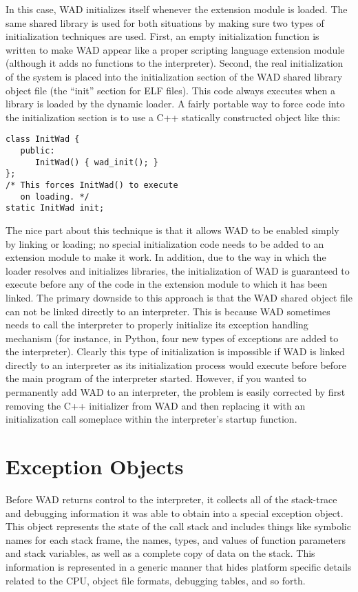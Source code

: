In this case, WAD initializes itself whenever the extension module is
loaded.  The same shared library is used for both situations by making
sure two types of initialization techniques are used.  First, an empty
initialization function is written to make WAD appear like a proper
scripting language extension module (although it adds no functions to
the interpreter).  Second, the real initialization of the system is
placed into the initialization section of the WAD shared library
object file (the ``init'' section for ELF files).  This code always executes
when a library is loaded by the dynamic loader.  A fairly portable way
to force code into the initialization section is to use a C++
statically constructed object like this:

\begin{verbatim}
class InitWad {
   public:
      InitWad() { wad_init(); }
};
/* This forces InitWad() to execute
   on loading. */
static InitWad init;
\end{verbatim}

The nice part about this technique is that it allows WAD to be enabled
simply by linking or loading; no special initialization code needs to
be added to an extension module to make it work.  In addition, due to
the way in which the loader resolves and initializes libraries, the
initialization of WAD is guaranteed to execute before any of the code
in the extension module to which it has been linked.  The primary
downside to this approach is that the WAD shared object file can not be
linked directly to an interpreter.   This is because WAD sometimes needs to call the
interpreter to properly initialize its exception handling mechanism (for instance, in Python,
four new types of exceptions are added to the interpreter).  Clearly this type of initialization
is impossible if WAD is linked directly to an interpreter as 
its initialization process would execute before before the main program of the
interpreter started.  However, 
if you wanted to permanently add WAD to an interpreter, the problem is easily
corrected by first removing the C++ initializer from WAD and then replacing it with an
initialization call someplace within the interpreter's startup function.

\section{Exception Objects}

Before WAD returns control to the interpreter, it collects all of the
stack-trace and debugging information it was able to obtain into a
special exception object. This object represents the state of the call
stack and includes things like symbolic names for each stack frame,
the names, types, and values of function parameters and stack
variables, as well as a complete copy of data on the stack. This
information is represented in a generic manner that hides
platform specific details related to the CPU, object file formats,
debugging tables, and so forth.

